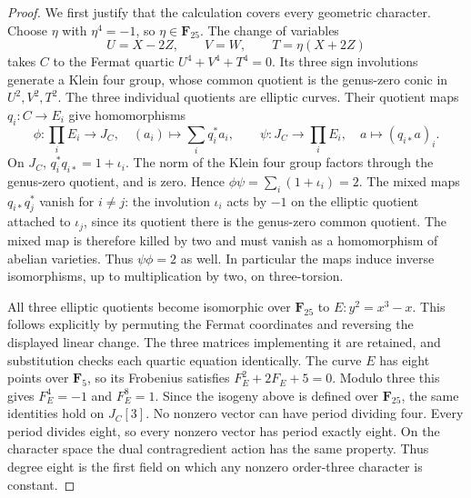 \begin{proof}
We first justify that the calculation covers every geometric character.
Choose $\eta$ with $\eta^4=-1$, so $\eta\in\mathbf F _{25}$.
The change of variables
\[
 U=X-2Z,\qquad V=W,\qquad T=\eta(X+2Z)
\]
takes $C$ to the Fermat quartic $U^4+V^4+T^4=0$.
Its three sign involutions generate a Klein four group, whose common
quotient is the genus-zero conic in $U^2,V^2,T^2$.
The three individual quotients are elliptic curves. Their quotient
maps $q_i:C\to E_i$ give homomorphisms
\[
 \phi:\prod_iE_i\to J_C,\quad (a_i)\mapsto\sum_iq_i^*a_i,
 \qquad
 \psi:J_C\to\prod_iE_i,\quad a\mapsto(q_{i*}a)_i.
\]
On $J_C$, $q_i^*q_{i*}=1+\iota_i$. The norm of the Klein four
group factors through the genus-zero quotient, and is zero. Hence
$\phi\psi=\sum_i(1+\iota_i)=2$. The mixed maps
$q_{i*}q_j^*$ vanish for $i\ne j$: the involution $\iota_i$ acts
by $-1$ on the elliptic quotient attached to $\iota_j$, since its
quotient there is the genus-zero common quotient. The mixed map is
therefore killed by two and must vanish as a homomorphism of abelian
varieties. Thus $\psi\phi=2$ as well. In particular the maps induce
inverse isomorphisms, up to multiplication by two, on three-torsion.

All three elliptic quotients become isomorphic over $\mathbf F _{25}$
to $E:y^2=x^3-x$. This follows explicitly by permuting the Fermat
coordinates and reversing the displayed linear change. The three
matrices implementing it are retained, and substitution checks each
quartic equation identically. The curve $E$ has eight points over
$\mathbf F _5$, so its Frobenius satisfies
$F_E^2+2F_E+5=0$. Modulo three this gives $F_E^4=-1$ and
$F_E^8=1$. Since the isogeny above is defined over $\mathbf F _{25}$,
the same identities hold on $J_C[3]$. No nonzero vector can have
period dividing four. Every period divides eight, so every nonzero
vector has period exactly eight. On the character space the dual
contragredient action has the same property. Thus degree eight is
the first field on which any nonzero order-three character is constant.


\end{proof}
